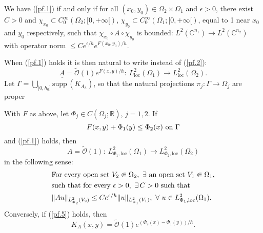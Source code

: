 \documentclass{article}
\newcommand{\RM}{\mathbb{R}}
\newcommand{\CM}{\mathbb{C}}
\begin{document}
We have (\ref{pf.1}) if and only if for all
$(x_0,y_0)\in \Omega _2\times \Omega _1$ and $\epsilon >0$, there
exist $C>0$ and
$\chi _{x_0}\subset C_0^\infty (\Omega _2;[0,+\infty [)$,
$\chi _{y_0}\subset C_0^\infty (\Omega _1;[0,+\infty [)$, equal to 1
near $x_0$ and $y_0$ respectively, such that
$\chi _{x_0}\circ A \circ \chi _{y_0}$ is bounded:
$L^2(\CM^{n_1})\to L^2(\CM^{n_2}) $ with operator norm
$\le Ce^{\epsilon /h}e^{F(x_0,y_0)/h}$.

When (\ref{pf.1}) holds it is then natural to write instead of
(\ref{pf.2}):
\begin{equation}\label{pf.3}
  A=\widetilde{\mathcal{ O}}(1)e^{F(x,y)/h}:\ L^2_{\mathrm{loc}}(\Omega
  _1)\to L^2_{\mathrm{loc}}(\Omega _2).
\end{equation}
Let $\Gamma =\overline{\bigcup_{]0,h_0]}\mathrm{supp\,}(K_{A_h}) }$,
so that the natural projections $\pi _j:\Gamma \to \Omega _j$ are
proper

\par With $F$ as above, let $\Phi _j\in C(\Omega _j;\RM)$, $j=1,2$. If
\begin{equation}\label{pf.4}
  F(x,y)+\Phi _1(y)\le \Phi _2(x) \hbox{ on }\Gamma 
\end{equation}
and (\ref{pf.1}) holds, then
\begin{equation}\label{pf.5}
  A=\widetilde{\mathcal{ O}}(1):\ L^2_{\Phi _1,\mathrm{loc}}(\Omega _1)\to L^2_{\Phi _2,\mathrm{loc}}(\Omega _2)
\end{equation}
in the following sense:
\begin{equation}\label{pf.6}\begin{split}
    &\hbox{For every open set }V_2\Subset \Omega _2, \ \exists \hbox{
      an
      open set }V_1\Subset \Omega _1,\\
    &\hbox{such that for every }\epsilon >0,\ \exists\, C>0\hbox{ such
      that}\\
    &\| Au\|_{L^2_{\Phi _2}(V_2)}\le Ce^{\epsilon /h} \|
    u\|_{L^2_{\Phi _1}(V_1)},\ \forall\ u\in L^2_{\Phi
      _1,\mathrm{loc}}(\Omega _1).
  \end{split}
\end{equation}
Conversely, if (\ref{pf.5}) holds, then
\begin{equation}\label{pf.7}
  K_A(x,y)=\widetilde{\mathcal{ O}} (1)e^{(\Phi _2(x)-\Phi _1(y))/h}.
\end{equation}
\end{document}
